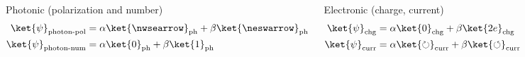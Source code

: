 \documentclass[handout]{beamer}
\begin{document}
\begin{frame}
\begin{columns}
    \begin{block}{Photonic (polarization and number)}
      \vspace*{-\baselineskip}
      \begin{align*}
        \ket{\psi}_{\text{photon-pol}} &= \alpha\ket{\nwsearrow}_{\text{ph}} +
                                       \beta\ket{\neswarrow}_{\text{ph}} %
        \\ %
        \ket{\psi}_{\text{photon-num}} &= \alpha\ket{0}_{\text{ph}} +
                                      \beta\ket{1}_{\text{ph}} %
      \end{align*}
    \end{block}
    
    \begin{block}{Electronic (charge, current)}
      \vspace*{-\baselineskip}
      \begin{align*}
        \ket{\psi}_{\text{chg}} &= \alpha\ket{0}_{\text{chg}} +
                                  \beta\ket{2e}_{\text{chg}} %
        \\ %
        \ket{\psi}_{\text{curr}} &= \alpha\ket{\circlearrowright}_{\text{curr}} +
                                   \beta\ket{\circlearrowleft}_{\text{curr}} %
      \end{align*}
    \end{block}
  \end{columns}
\end{frame}
\end{document}
